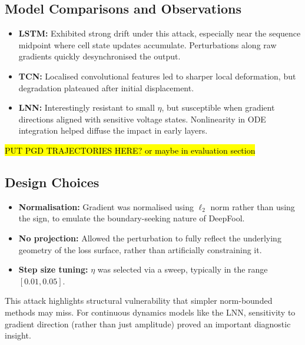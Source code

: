 \subsection{Model Comparisons and Observations}
\begin{itemize}
    \item \textbf{LSTM:} Exhibited strong drift under this attack, especially near the sequence midpoint where cell state updates accumulate. Perturbations along raw gradients quickly desynchronised the output.
    \item \textbf{TCN:} Localised convolutional features led to sharper local deformation, but degradation plateaued after initial displacement.
    \item \textbf{LNN:} Interestingly resistant to small $\eta$, but susceptible when gradient directions aligned with sensitive voltage states. Nonlinearity in ODE integration helped diffuse the impact in early layers.
\end{itemize}

\hl{PUT PGD TRAJECTORIES HERE? or maybe in evaluation section}


\subsection{Design Choices}
\begin{itemize}
    \item \textbf{Normalisation:} Gradient was normalised using $\ell_2$ norm rather than using the sign, to emulate the boundary-seeking nature of DeepFool.
    \item \textbf{No projection:} Allowed the perturbation to fully reflect the underlying geometry of the loss surface, rather than artificially constraining it.
    \item \textbf{Step size tuning:} $\eta$ was selected via a sweep, typically in the range $[0.01, 0.05]$.
\end{itemize}

This attack highlights structural vulnerability that simpler norm-bounded methods may miss. For continuous dynamics models like the LNN, sensitivity to gradient direction (rather than just amplitude) proved an important diagnostic insight.

